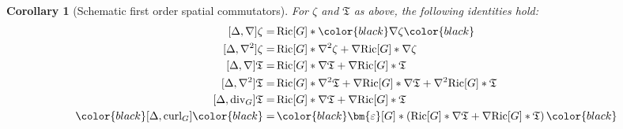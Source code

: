 \documentclass[11pt,leqno,textwidth=10cm]{amsart}
\numberwithin{equation}{section}
\theoremstyle{definition}
\theoremstyle{plain}
\newtheorem{corollary}[definition]{Corollary}
\newcommand{\1}{\mathbbm{1}}
\newcommand{\Ric}{\text{\normalfont{Ric}}}
\newcommand{\Riem}{\text{\normalfont{Riem}}}
\renewcommand{\epsilon}{\varepsilon}
\newcommand{\Lap}{\Delta}
\renewcommand{\div}{\text{\normalfont{div}}}
\newcommand{\curl}{\text{\normalfont{curl}}}
\newcommand{\numberthis}{\addtocounter{equation}{1}\tag{\theequation}}
\renewcommand{\theequation}{\arabic{section}.\arabic{equation}}
\newcommand{\epsilonLC}{\bm{\epsilon}}
\newcommand{\change}[1]{\color{black}#1\color{black}}
\begin{document}
%
%
\begin{corollary}[Schematic first order spatial commutators]\label{lem:comm-space-first}
For $\zeta$ and $\mathfrak{T}$ as above, the following identities hold:
\begin{subequations}
\begin{align}
[\Lap,\nabla]\zeta=&\,\Ric[G]\ast\change{\nabla\zeta}\label{eq:[Lap,nabla]SF}\\
[\Lap,\nabla^2]\zeta=&\,\Ric[G]\ast\nabla^2\zeta+\nabla\Ric[G]\ast\nabla\zeta\label{eq:[Lap,nabla2]SF}\\
[\Lap,\nabla]\mathfrak{T}=&\,\Ric[G]\ast\nabla\mathfrak{T}+\nabla \Ric[G]\ast\mathfrak{T}\label{eq:[Lap,nabla]T}\\
[\Lap,\nabla^2]\mathfrak{T}=&\,\Ric[G]\ast\nabla^2\mathfrak{T}+\nabla\Ric[G]\ast\nabla\mathfrak{T}+\nabla^2\Ric[G]\ast\mathfrak{T}\label{eq:[Lap,nabla2]T}\\
[\Lap,\div_G]\mathfrak{T}=&\,\Ric[G]\ast\nabla\mathfrak{T}+\nabla\Ric[G]\ast\mathfrak{T}\label{eq:[Lap,div]}\\
\change{[\Lap,\curl_G]}=&\,\change{\epsilonLC[G]\ast\left(\Ric[G]\ast\nabla\mathfrak{T}+\nabla\Ric[G]\ast\mathfrak{T}\right)}\label{eq:[Lap,curl]}
\end{align}
\end{subequations}
\end{corollary}
\end{document}
